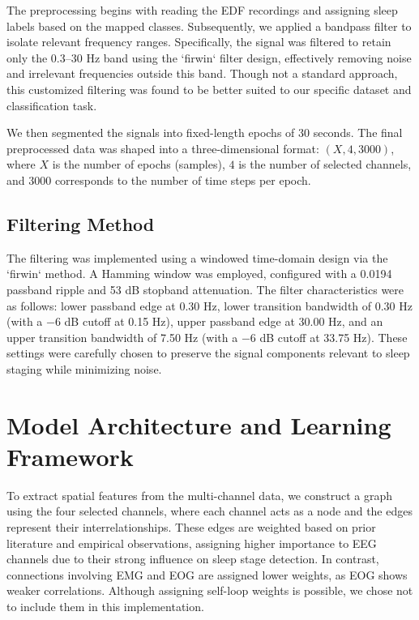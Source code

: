The preprocessing begins with reading the EDF recordings and assigning sleep labels based on the mapped classes. Subsequently, we applied a bandpass filter to isolate relevant frequency ranges. Specifically, the signal was filtered to retain only the 0.3–30 Hz band using the `firwin` filter design, effectively removing noise and irrelevant frequencies outside this band. Though not a standard approach, this customized filtering was found to be better suited to our specific dataset and classification task.

We then segmented the signals into fixed-length epochs of 30 seconds. The final preprocessed data was shaped into a three-dimensional format: $(X, 4, 3000)$, where $X$ is the number of epochs (samples), $4$ is the number of selected channels, and $3000$ corresponds to the number of time steps per epoch.

\subsection{Filtering Method}

The filtering was implemented using a windowed time-domain design via the `firwin` method. A Hamming window was employed, configured with a 0.0194 passband ripple and 53 dB stopband attenuation. The filter characteristics were as follows: lower passband edge at 0.30 Hz, lower transition bandwidth of 0.30 Hz (with a $-6$ dB cutoff at 0.15 Hz), upper passband edge at 30.00 Hz, and an upper transition bandwidth of 7.50 Hz (with a $-6$ dB cutoff at 33.75 Hz). These settings were carefully chosen to preserve the signal components relevant to sleep staging while minimizing noise.





\section{Model Architecture and Learning Framework}

To extract spatial features from the multi-channel data, we construct a graph using the four selected channels, where each channel acts as a node and the edges represent their interrelationships. These edges are weighted based on prior literature and empirical observations, assigning higher importance to EEG channels due to their strong influence on sleep stage detection. In contrast, connections involving EMG and EOG are assigned lower weights, as EOG shows weaker correlations. Although assigning self-loop weights is possible, we chose not to include them in this implementation.


